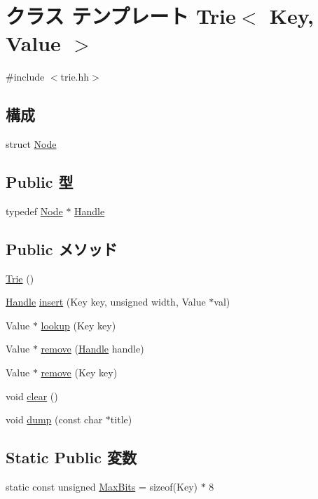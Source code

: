 \hypertarget{classTrie}{
\section{クラス テンプレート Trie$<$ Key, Value $>$}
\label{classTrie}
}


{\ttfamily \#include $<$trie.hh$>$}\subsection*{構成}
\begin{DoxyCompactItemize}
\item 
struct \hyperlink{structTrie_1_1Node}{Node}
\end{DoxyCompactItemize}
\subsection*{Public 型}
\begin{DoxyCompactItemize}
\item 
typedef \hyperlink{structTrie_1_1Node}{Node} $\ast$ \hyperlink{classTrie_a9c85d428a12b0d5a24c678a5a010b97e}{Handle}
\end{DoxyCompactItemize}
\subsection*{Public メソッド}
\begin{DoxyCompactItemize}
\item 
\hyperlink{classTrie_afa1796b4255b39148352d11b224a13dc}{Trie} ()
\item 
\hyperlink{structTrie_1_1Node}{Handle} \hyperlink{classTrie_ae59d2fa56f1f1cdc960689dd80bd1dbb}{insert} (Key key, unsigned width, Value $\ast$val)
\item 
Value $\ast$ \hyperlink{classTrie_acb9c4b2b263f23de8efe4c043e82ea38}{lookup} (Key key)
\item 
Value $\ast$ \hyperlink{classTrie_a9c941ee8c8702adb12e3e404fc275edb}{remove} (\hyperlink{structTrie_1_1Node}{Handle} handle)
\item 
Value $\ast$ \hyperlink{classTrie_a0a3ff133d42acb848a9bb45b85b0ba93}{remove} (Key key)
\item 
void \hyperlink{classTrie_ac8bb3912a3ce86b15842e79d0b421204}{clear} ()
\item 
void \hyperlink{classTrie_acf136bb7c799dc0e3c697a19cc2a61e8}{dump} (const char $\ast$title)
\end{DoxyCompactItemize}
\subsection*{Static Public 変数}
\begin{DoxyCompactItemize}
\item 
static const unsigned \hyperlink{classTrie_a053e1542a5279ab920fa8fa174e9eda9}{MaxBits} = sizeof(Key) $\ast$ 8
\end{DoxyCompactItemize}
